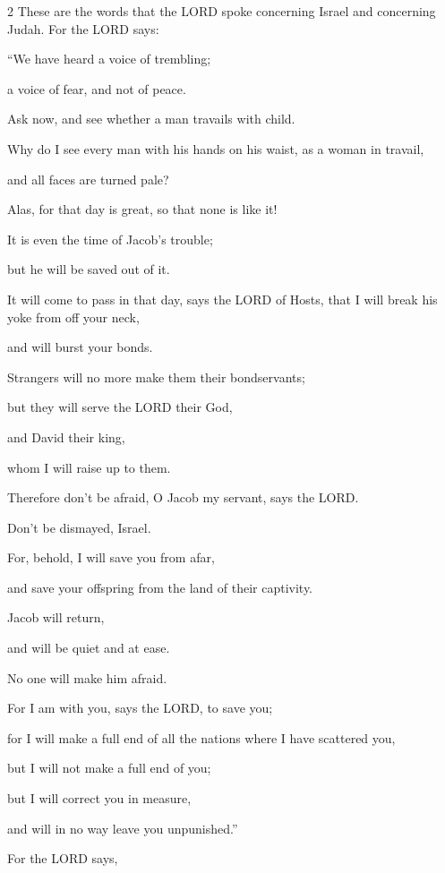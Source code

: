 \begin{multicols}{2}
\myverse{}These are the words that the LORD spoke concerning Israel and concerning Judah.	\myverse{}For the LORD says:
			
“We have heard a voice of trembling;
			
a voice of fear, and not of peace.
						
\myverse{}Ask now, and see whether a man travails with child.
			
Why do I see every man with his hands on his waist, as a woman in travail,
			
and all faces are turned pale?
						
\myverse{}Alas, for that day is great, so that none is like it!
			
It is even the time of Jacob’s trouble;
			
but he will be saved out of it.
			
			
\myverse{}It will come to pass in that day, says the LORD of Hosts, that I will break his yoke from off your neck,
			
and will burst your bonds.
			
Strangers will no more make them their bondservants;
						
\myverse{}but they will serve the LORD their God,
			
and David their king,
			
whom I will raise up to them.
						
\myverse{}Therefore don’t be afraid, O Jacob my servant, says the LORD.
			
Don’t be dismayed, Israel.
			
For, behold, I will save you from afar,
			
and save your offspring from the land of their captivity.
			
Jacob will return,
			
and will be quiet and at ease.
			
No one will make him afraid.
						
\myverse{}For I am with you, says the LORD, to save you;
			
for I will make a full end of all the nations where I have scattered you,
			
but I will not make a full end of you;
			
but I will correct you in measure,
			
and will in no way leave you unpunished.”
			
\myverse{}For the LORD says,


\end{multicols}
